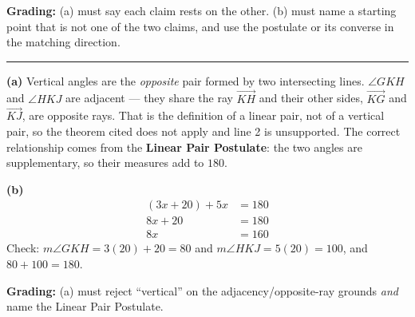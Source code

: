 \documentclass[12pt]{article}
\begin{document}
\textbf{Grading:} (a) must say each claim rests on the other. (b) must name a starting point that is not one of the two claims, and use the postulate or its converse in the matching direction.

\vspace{0.2cm}\noindent\rule{\linewidth}{0.2pt}


\textbf{(a)} Vertical angles are the \emph{opposite} pair formed by two intersecting lines. $\angle GKH$ and $\angle HKJ$ are adjacent --- they share the ray $\overrightarrow{KH}$ and their other sides, $\overrightarrow{KG}$ and $\overrightarrow{KJ}$, are opposite rays. That is the definition of a linear pair, not of a vertical pair, so the theorem cited does not apply and line 2 is unsupported. The correct relationship comes from the \textbf{Linear Pair Postulate}: the two angles are supplementary, so their measures add to $180$.

\textbf{(b)}
\begin{align*}
  (3x + 20) + 5x &= 180 \\
  8x + 20 &= 180 \\
  8x &= 160
\end{align*}
Check: $m\angle GKH = 3(20) + 20 = 80$ and $m\angle HKJ = 5(20) = 100$, and $80 + 100 = 180$. 

\textbf{Grading:} (a) must reject ``vertical'' on the adjacency/opposite-ray grounds \emph{and} name the Linear Pair Postulate.
\end{document}
